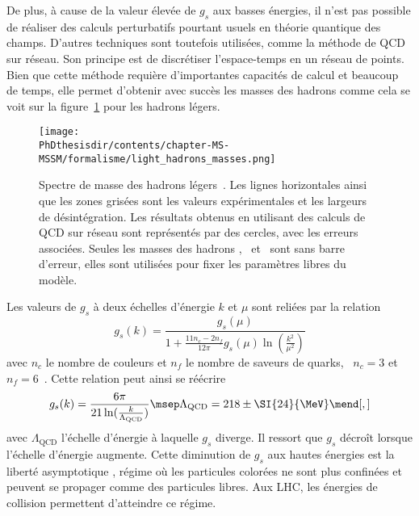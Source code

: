 \par De plus, à cause de la valeur élevée de $g_s$ aux basses énergies, il n'est pas possible de réaliser des calculs perturbatifs pourtant usuels en théorie quantique des champs.
D'autres techniques sont toutefois utilisées, comme la méthode de QCD sur réseau. Son principe est de discrétiser l'espace-temps en un réseau de points. Bien que cette méthode requière d'importantes capacités de calcul et beaucoup de temps, elle permet d'obtenir avec succès les masses des hadrons comme cela se voit sur la figure~\ref{fig-lattice_QCD_masses} pour les hadrons légers.
\begin{figure}[h]
\centering
\texttt{[image: \\PhDthesisdir/contents/chapter-MS-MSSM/formalisme/light\_hadrons\_masses.png]}
\caption[Spectre de masse des hadrons légers.]{Spectre de masse des hadrons légers~\cite{ab_initio_hadron_masses}. Les lignes horizontales ainsi que les zones grisées sont les valeurs expérimentales et les largeurs de désintégration. Les résultats obtenus en utilisant des calculs de QCD sur réseau sont représentés par des cercles, avec les erreurs associées. Seules les masses des hadrons \pion, \Kaon\ et \Xibaryon\ sont sans barre d'erreur, elles sont utilisées pour fixer les paramètres libres du modèle.}
\label{fig-lattice_QCD_masses}
\end{figure}
\par Les valeurs de $g_s$ à deux échelles d'énergie $k$ et $\mu$ sont reliées par la relation
\begin{equation}
g_s(k) = \frac{g_s(\mu)}{1+ \frac{11n_c-2n_f}{12\pi} g_s(\mu)\ln(\frac{k^2}{\mu^2})}
\end{equation}
avec $n_c$ le nombre de couleurs et $n_f$ le nombre de saveurs de quarks, \ie\ $n_c=3$ et $n_f=6$~\cite{salam2010elements}.
Cette relation peut ainsi se réécrire
\begin{equation}
g_s (k) =
\frac{6\pi}{21 \ln(\frac{k}{\Lambda_\text{QCD}})}
\msep
\Lambda_\text{QCD} = 218\pm\SI{24}{\MeV}
\mend[,]
\end{equation}
avec $\Lambda_\text{QCD}$ l'échelle d'énergie à laquelle $g_s$ diverge.
Il ressort que $g_s$ décroît lorsque l'échelle d'énergie augmente.
Cette diminution de $g_s$ aux hautes énergies est la \og liberté asymptotique \fg, régime où les particules colorées ne sont plus confinées et peuvent se propager comme des particules libres. Aux LHC, les énergies de collision permettent d'atteindre ce régime.
